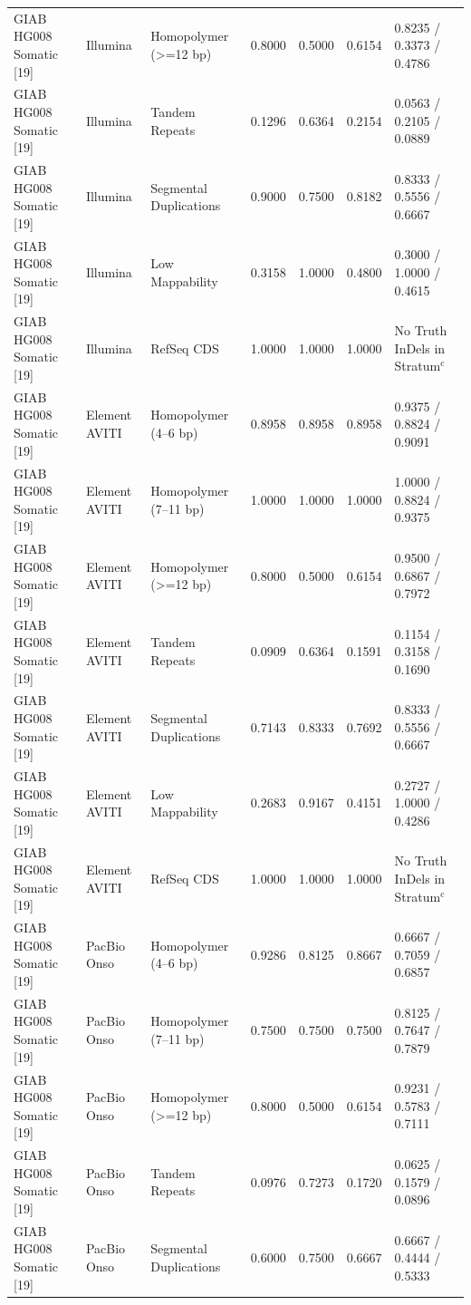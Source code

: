 \begin{table}[htbp]
{\begin{tabular}{lllllll}
GIAB HG008 Somatic [19] & Illumina & Homopolymer (\textgreater{}=12 bp) & 0.8000 & 0.5000 & 0.6154 & 0.8235 / 0.3373 / 0.4786 \\
GIAB HG008 Somatic [19] & Illumina & Tandem Repeats & 0.1296 & 0.6364 & 0.2154 & 0.0563 / 0.2105 / 0.0889 \\
GIAB HG008 Somatic [19] & Illumina & Segmental Duplications & 0.9000 & 0.7500 & 0.8182 & 0.8333 / 0.5556 / 0.6667 \\
GIAB HG008 Somatic [19] & Illumina & Low Mappability & 0.3158 & 1.0000 & 0.4800 & 0.3000 / 1.0000 / 0.4615 \\
GIAB HG008 Somatic [19] & Illumina & RefSeq CDS & 1.0000 & 1.0000 & 1.0000 & No Truth InDels in Stratum$^{\text{c}}$ \\
GIAB HG008 Somatic [19] & Element AVITI & Homopolymer (4--6 bp) & 0.8958 & 0.8958 & 0.8958 & 0.9375 / 0.8824 / 0.9091 \\
GIAB HG008 Somatic [19] & Element AVITI & Homopolymer (7--11 bp) & 1.0000 & 1.0000 & 1.0000 & 1.0000 / 0.8824 / 0.9375 \\
GIAB HG008 Somatic [19] & Element AVITI & Homopolymer (\textgreater{}=12 bp) & 0.8000 & 0.5000 & 0.6154 & 0.9500 / 0.6867 / 0.7972 \\
GIAB HG008 Somatic [19] & Element AVITI & Tandem Repeats & 0.0909 & 0.6364 & 0.1591 & 0.1154 / 0.3158 / 0.1690 \\
GIAB HG008 Somatic [19] & Element AVITI & Segmental Duplications & 0.7143 & 0.8333 & 0.7692 & 0.8333 / 0.5556 / 0.6667 \\
GIAB HG008 Somatic [19] & Element AVITI & Low Mappability & 0.2683 & 0.9167 & 0.4151 & 0.2727 / 1.0000 / 0.4286 \\
GIAB HG008 Somatic [19] & Element AVITI & RefSeq CDS & 1.0000 & 1.0000 & 1.0000 & No Truth InDels in Stratum$^{\text{c}}$ \\
GIAB HG008 Somatic [19] & PacBio Onso & Homopolymer (4--6 bp) & 0.9286 & 0.8125 & 0.8667 & 0.6667 / 0.7059 / 0.6857 \\
GIAB HG008 Somatic [19] & PacBio Onso & Homopolymer (7--11 bp) & 0.7500 & 0.7500 & 0.7500 & 0.8125 / 0.7647 / 0.7879 \\
GIAB HG008 Somatic [19] & PacBio Onso & Homopolymer (\textgreater{}=12 bp) & 0.8000 & 0.5000 & 0.6154 & 0.9231 / 0.5783 / 0.7111 \\
GIAB HG008 Somatic [19] & PacBio Onso & Tandem Repeats & 0.0976 & 0.7273 & 0.1720 & 0.0625 / 0.1579 / 0.0896 \\
GIAB HG008 Somatic [19] & PacBio Onso & Segmental Duplications & 0.6000 & 0.7500 & 0.6667 & 0.6667 / 0.4444 / 0.5333 \\

\end{tabular}}
\end{table}

